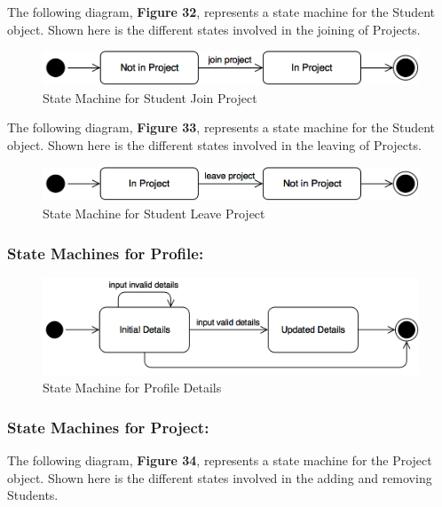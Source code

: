 \documentclass[12pt,letterpaper]{article}
\begin{document}
The following diagram, {\bf Figure 32}, represents a state machine for the Student object. Shown here is the different states involved in the joining of Projects.

\begin{figure}[H]
	\centering{}
	\includegraphics[scale=0.3]{imgs/state/student-join-project.png}
	\caption{State Machine for Student Join Project}
\end{figure}

The following diagram, {\bf Figure 33}, represents a state machine for the Student object. Shown here is the different states involved in the leaving of Projects.

\begin{figure}[H]
	\centering{}
	\includegraphics[scale=0.3]{imgs/state/student-leave-project.png}
	\caption{State Machine for Student Leave Project}
\end{figure}

\subsubsection*{State Machines for Profile:}

\begin{figure}[H]
	\centering{}
	\includegraphics[scale=0.3]{imgs/state/profile-details.png}
	\caption{State Machine for Profile Details}
\end{figure}

\subsubsection*{State Machines for Project:}

The following diagram, {\bf Figure 34}, represents a state machine for the Project object. Shown here is the different states involved in the adding and removing Students.
\end{document}
